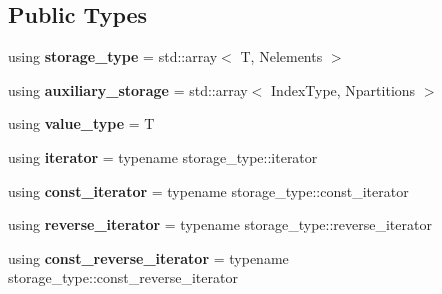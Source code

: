 \subsection*{Public Types}
\begin{DoxyCompactItemize}
\item 
\mbox{\label{structsequoia_1_1data__structures_1_1static__contiguous__data_1_1data_a6f359502be7c1b176f842c322b155890}} 
using {\bfseries storage\+\_\+type} = std\+::array$<$ T, Nelements $>$
\item 
\mbox{\label{structsequoia_1_1data__structures_1_1static__contiguous__data_1_1data_ad5a446ad648d15cb9576d3d665604197}} 
using {\bfseries auxiliary\+\_\+storage} = std\+::array$<$ Index\+Type, Npartitions $>$
\item 
\mbox{\label{structsequoia_1_1data__structures_1_1static__contiguous__data_1_1data_a7b54df8b6ebd5f3951f6e244c62b787e}} 
using {\bfseries value\+\_\+type} = T
\item 
\mbox{\label{structsequoia_1_1data__structures_1_1static__contiguous__data_1_1data_adbe85d5473933964483e0dcba72e09ed}} 
using {\bfseries iterator} = typename storage\+\_\+type\+::iterator
\item 
\mbox{\label{structsequoia_1_1data__structures_1_1static__contiguous__data_1_1data_aed947f15476ee8f9ff7ef61506497164}} 
using {\bfseries const\+\_\+iterator} = typename storage\+\_\+type\+::const\+\_\+iterator
\item 
\mbox{\label{structsequoia_1_1data__structures_1_1static__contiguous__data_1_1data_a32aae75affb93d2ae4861ba9ab8f7b72}} 
using {\bfseries reverse\+\_\+iterator} = typename storage\+\_\+type\+::reverse\+\_\+iterator
\item 
\mbox{\label{structsequoia_1_1data__structures_1_1static__contiguous__data_1_1data_a649069e3369d73a83c37828adcaa67d5}} 
using {\bfseries const\+\_\+reverse\+\_\+iterator} = typename storage\+\_\+type\+::const\+\_\+reverse\+\_\+iterator
\end{DoxyCompactItemize}
